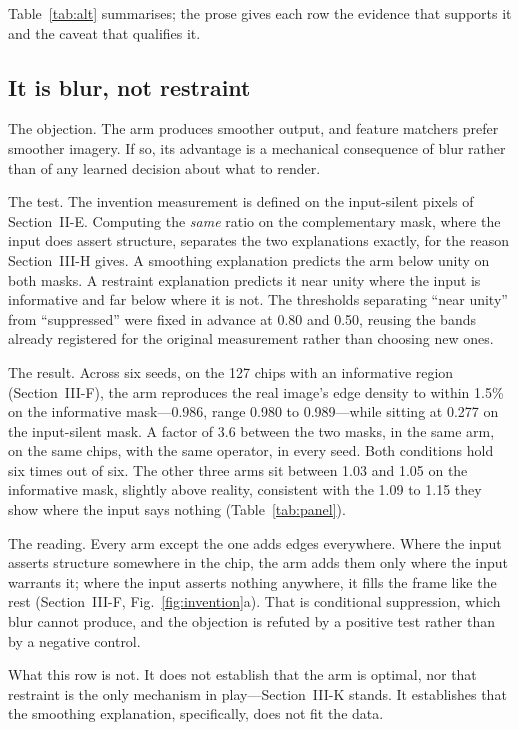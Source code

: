 Table~\ref{tab:alt} summarises; the prose gives each row the
evidence that supports it and the caveat that qualifies it.

\subsection{It is blur, not restraint}

The objection. The \Lone{} arm produces smoother output, and feature matchers
prefer smoother imagery. If so, its advantage is a mechanical consequence of blur rather
than of any learned decision about what to render.

The test. The invention measurement is defined on the input-silent pixels of
Section~II-E. Computing the \emph{same} ratio on the
complementary mask, where the input does assert structure, separates the two explanations exactly, for the reason Section~III-H gives. A smoothing
explanation predicts the \Lone{} arm below unity on both
masks. A restraint explanation predicts it near unity where the input is informative and
far below where it is not. The thresholds separating ``near unity'' from ``suppressed''
were fixed in advance at 0.80 and 0.50, reusing the bands already registered for the
original measurement rather than choosing new ones.

The result. Across six seeds, on the 127 chips with an informative region
(Section~III-F), the \Lone{} arm reproduces the real image's edge
density to within 1.5\% on the informative mask---0.986, range 0.980 to 0.989---while
sitting at 0.277 on the input-silent mask. A factor of 3.6 between the two
masks, in the same arm, on the same chips, with the same operator, in every seed. Both
conditions hold six times out of six. The other three arms sit between 1.03 and 1.05 on
the informative mask, slightly above reality, consistent with the 1.09 to 1.15
they show where the input says nothing (Table~\ref{tab:panel}).

The reading. Every arm except the \Lone{} one adds edges everywhere. Where the input
asserts structure somewhere in the chip, the \Lone{} arm adds them only where the input
warrants it; where the input asserts nothing anywhere, it fills the frame like the rest
(Section~III-F, Fig.~\ref{fig:invention}a). That is conditional suppression,
which blur cannot produce, and the objection is refuted by a positive test rather than by
a negative control.

What this row is not. It does not establish that the \Lone{} arm is optimal, nor
that restraint is the only mechanism in play---Section~III-K stands. It establishes that the smoothing explanation, specifically, does not fit the
data.


